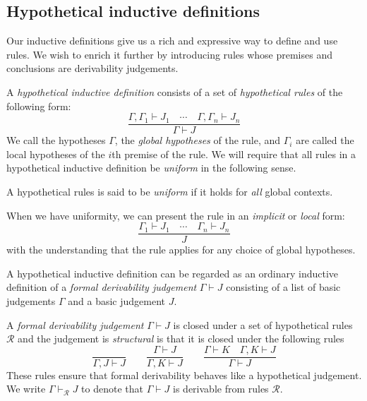 \subsection{Hypothetical inductive definitions}

Our inductive definitions give us a rich and expressive way to define and use rules. We wish to enrich it further by introducing rules whose premises and conclusions are derivability judgements.

\begin{defin}
    A \emph{hypothetical inductive definition} consists of a set of \emph{hypothetical rules} of the following form:
    $$
        \frac{\Gamma, \Gamma_1 \vdash J_1 \quad \cdots \quad \Gamma, \Gamma_n \vdash J_n}{\Gamma \vdash J}
    $$
    We call the hypotheses $\Gamma$, the \emph{global hypotheses} of the rule, and $\Gamma_i$ are called the local hypotheses of the $i$th premise of the rule. We will require that all rules in a hypothetical inductive definition be \emph{uniform} in the following sense.
\end{defin}

\begin{defin}
    A hypothetical rules is said to be \emph{uniform} if it holds for \emph{all} global contexts.
\end{defin}

\begin{remark}
    When we have uniformity, we can present the rule in an \emph{implicit} or \emph{local} form:
    $$
        \frac{\Gamma_1 \vdash J_1 \quad \cdots \quad \Gamma_n \vdash J_n}{J}
    $$
    with the understanding that the rule applies for any choice of global hypotheses.
\end{remark}

\begin{remark}
    A hypothetical inductive definition can be regarded as an ordinary inductive definition of a \emph{formal derivability judgement} $\Gamma \vdash J$ consisting of a list of basic judgements $\Gamma$ and a basic judgement $J$.
\end{remark}

\begin{defin}
    A \emph{formal derivability judgement} $\Gamma \vdash J$ is closed under a set of hypothetical rules $\mathcal{R}$ and the judgement is \emph{structural} is that it is closed under the following rules
    $$
        \frac{}{\Gamma, J \vdash J} \qquad
        \frac{\Gamma \vdash J}{\Gamma , K \vdash J} \qquad
        \frac{\Gamma \vdash K \quad \Gamma , K \vdash J}{\Gamma \vdash J}
    $$
    These rules ensure that formal derivability behaves like a hypothetical judgement. We write $\Gamma \vdash_{\mathcal{R}} J$ to denote that $\Gamma \vdash J$ is derivable from rules $\mathcal{R}$.
\end{defin}

